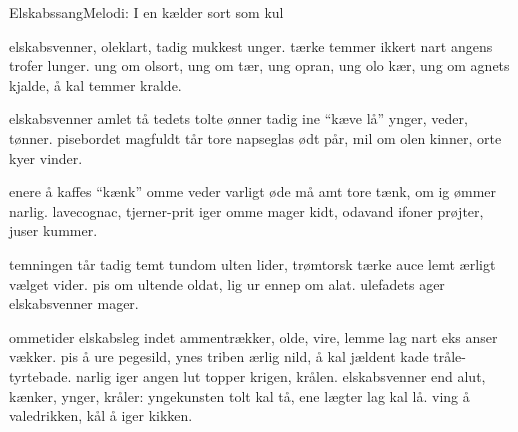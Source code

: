 \begin{sang}{Elskabssang}{Melodi: I en kælder sort som kul}
\begin{vers}
elskabsvenner, oleklart,
tadig mukkest unger.
tærke temmer ikkert nart
angens trofer lunger.
ung om olsort, ung om tær,
ung opran, ung olo kær,
ung om agnets kjalde, 
å kal temmer kralde.
\end{vers}
\begin{vers}
elskabsvenner amlet tå
tedets tolte ønner
tadig ine ``kæve lå''
ynger, veder, tønner.
pisebordet magfuldt tår
tore napseglas ødt pår,
mil om olen kinner, 
orte kyer vinder.
\end{vers}
\begin{vers}
enere å kaffes ``kænk''
omme veder varligt
øde må amt tore tænk,
om ig ømmer narlig.
lavecognac, tjerner-prit
iger omme mager kidt,
odavand ifoner 
prøjter, juser kummer.
\end{vers}
\begin{vers}
temningen tår tadig temt
tundom ulten lider,
trømtorsk tærke auce lemt
ærligt vælget vider.
pis om ultende oldat,
lig ur ennep om alat.
ulefadets ager  
elskabsvenner mager.
\end{vers}
\begin{vers}
ommetider elskabsleg
indet ammentrækker,
olde, vire, lemme lag
nart eks anser vækker.
pis å ure pegesild,
ynes triben ærlig nild,
å kal jældent kade 
tråle-tyrtebade.
narlig iger angen lut
topper krigen, krålen.
elskabsvenner end alut,
kænker, ynger, kråler:
yngekunsten tolt kal tå,
ene lægter lag kal lå.
ving å valedrikken, 
kål å iger kikken.
\end{vers}
\laps
\end{sang}